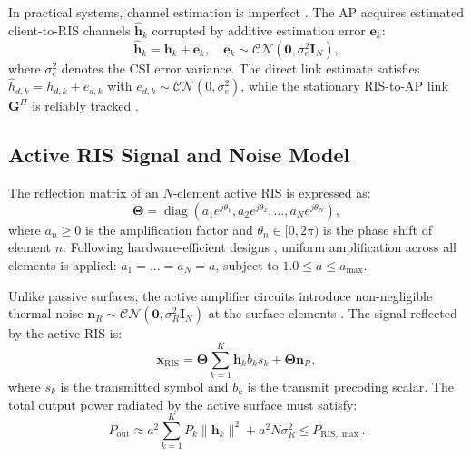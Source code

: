 \documentclass[journal,twocolumn]{IEEEtran}
\begin{document}
In practical systems, channel estimation is imperfect \cite{hao_zhou_d3ae4bac}. The AP acquires estimated client-to-RIS channels $\hat{\mathbf{h}}_k$ corrupted by additive estimation error $\mathbf{e}_k$:
\begin{equation}
    \hat{\mathbf{h}}_k = \mathbf{h}_k + \mathbf{e}_k, \quad \mathbf{e}_k \sim \mathcal{CN}(\mathbf{0}, \sigma_e^2 \mathbf{I}_N),
    \label{eq:imperfect_csi}
\end{equation}
where $\sigma_e^2$ denotes the CSI error variance. The direct link estimate satisfies $\hat{h}_{d,k} = h_{d,k} + e_{d,k}$ with $e_{d,k} \sim \mathcal{CN}(0, \sigma_e^2)$, while the stationary RIS-to-AP link $\mathbf{G}^H$ is reliably tracked \cite{ruizhe_long_83e9453a, jin_ho_yang_7e8f89d2}.

\subsection{Active RIS Signal and Noise Model}
The reflection matrix of an $N$-element active RIS is expressed as:
\begin{equation}
    \mathbf{\Theta} = \operatorname{diag}\left(a_1 e^{j\theta_1}, a_2 e^{j\theta_2}, \dots, a_N e^{j\theta_N}\right),
\end{equation}
where $a_n \ge 0$ is the amplification factor and $\theta_n \in [0, 2\pi)$ is the phase shift of element $n$. Following hardware-efficient designs \cite{ruizhe_long_83e9453a, zijian_zhang_9030ef0d}, uniform amplification across all elements is applied: $a_1 = \dots = a_N = a$, subject to $1.0 \le a \le a_{\max}$.

Unlike passive surfaces, the active amplifier circuits introduce non-negligible thermal noise $\mathbf{n}_R \sim \mathcal{CN}(\mathbf{0}, \sigma_R^2 \mathbf{I}_N)$ at the surface elements \cite{ruizhe_long_83e9453a}. The signal reflected by the active RIS is:
\begin{equation}
    \mathbf{x}_{\text{RIS}} = \mathbf{\Theta} \sum_{k=1}^K \mathbf{h}_k b_k s_k + \mathbf{\Theta} \mathbf{n}_R,
\end{equation}
where $s_k$ is the transmitted symbol and $b_k$ is the transmit precoding scalar. The total output power radiated by the active surface must satisfy:
\begin{equation}
    P_{\text{out}} \approx a^2 \sum_{k=1}^K P_k \|\mathbf{h}_k\|^2 + a^2 N \sigma_R^2 \le P_{\text{RIS},\max}.
    \label{eq:ris_power_constraint}
\end{equation}
\end{document}
